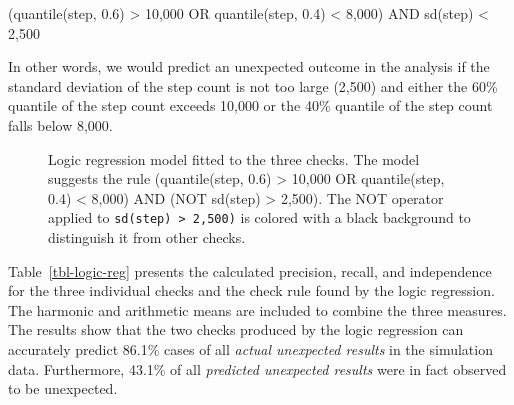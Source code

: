 \documentclass[
  12pt,
]{interact}
\begin{document}
(quantile(step, 0.6) \textgreater{} 10,000 OR quantile(step, 0.4)
\textless{} 8,000) AND sd(step) \textless{} 2,500

In other words, we would predict an unexpected outcome in the analysis
if the standard deviation of the step count is not too large (2,500) and
either the 60\% quantile of the step count exceeds 10,000 or the 40\%
quantile of the step count falls below 8,000.

\label{cell-fig-logic-reg}
\begin{figure}[H]


\caption{\label{fig-logic-reg}Logic regression model fitted to the three
checks. The model suggests the rule (quantile(step, 0.6) \textgreater{}
10,000 OR quantile(step, 0.4) \textless{} 8,000) AND (NOT sd(step)
\textgreater{} 2,500). The NOT operator applied to
\texttt{sd(step)\ \textgreater{}\ 2,500)} is colored with a black
background to distinguish it from other checks.}

\end{figure}%

Table~\ref{tbl-logic-reg} presents the calculated precision, recall, and
independence for the three individual checks and the check rule found by
the logic regression. The harmonic and arithmetic means are included to
combine the three measures. The results show that the two checks
produced by the logic regression can accurately predict 86.1\% cases of
all \emph{actual unexpected results} in the simulation data.
Furthermore, 43.1\% of all \emph{predicted unexpected results} were in
fact observed to be unexpected.
\end{document}
